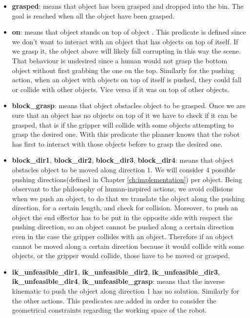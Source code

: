 \begin{itemize}
\item \textbf{grasped}:  means that object  has been grasped and dropped into the bin. The goal is reached when all the object have been grasped. 
\item \textbf{on}: means that object  stands on top of object . This predicate is defined since we don't want to interact with an object that has objects on top of itself. If we grasp it, the object above will likely fall corrupting in this way the scene. That behaviour is undesired since a human would not grasp the bottom object without first grabbing the one on the top. Similarly for the pushing action, when an object with objects on top of itself is pushed, they could fall or collide with other objects. Vice versa if it was on top of other objects.
\item \textbf{block\_grasp}:  means that object  obstacles  object  to be grasped. 
Once we are sure that an object has no objects on top of it we have to check if it can be grasped, that is if the gripper will collide with some objects attempting to grasp the desired one. With this predicate the planner knows that the robot has first to interact with those objects before to grasp the desired one.
\item \textbf{block\_dir1}, \textbf{block\_dir2}, \textbf{block\_dir3}, \textbf{block\_dir4}:  means that object  obstacles  object  to be moved along direction 1. We will consider 4 possible pushing directions(defined in Chapter \ref{ch:implementation}) per object. Being observant to the philosophy  of human-inspired actions, we avoid collisions when we push an object, to do that we translate the object along the pushing direction, for a certain length, and check for collision. Moreover, to push an object the end effector has to be put in the opposite side with respect the pushing direction, so an object cannot be pushed along a certain direction even in the case the gripper collides with an object.
Therefore if an object cannot be moved along a certain direction because it would collide with some objects, or the gripper would collide, those have to be moved or grasped.
\item \textbf{ik\_unfeasible\_dir1}, \textbf{ik\_unfeasible\_dir2}, \textbf{ik\_unfeasible\_dir3}, \textbf{ik\_unfeasible\_dir4}, \textbf{ik\_unfeasible\_grasp}:  means that the inverse kinematic to push the object  along direction 1 has no solution. Similarly for the other actions. This predicates are added in order to consider the geometrical constraints regarding the working space of the robot.
\end{itemize}

